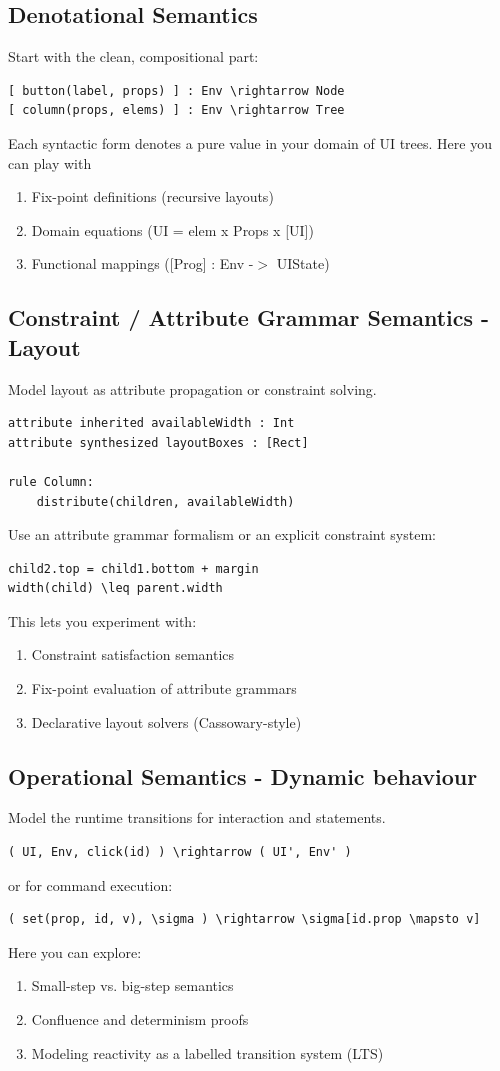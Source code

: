 \documentclass{article}
\begin{document}
\subsection{Denotational Semantics}
Start with the clean, compositional part:
\begin{verbatim}
[ button(label, props) ] : Env \rightarrow Node
[ column(props, elems) ] : Env \rightarrow Tree
\end{verbatim}
Each syntactic form denotes a pure value in your domain of UI trees. Here you can play with
\begin{enumerate}
\item Fix-point definitions (recursive layouts)
\item Domain equations (UI = elem x Props x [UI])
\item Functional mappings ([Prog] : Env -$>$ UIState)
\end{enumerate}

\subsection{Constraint / Attribute Grammar Semantics - Layout}
Model layout as attribute propagation or constraint solving.
\begin{verbatim}
attribute inherited availableWidth : Int
attribute synthesized layoutBoxes : [Rect]

rule Column:
	distribute(children, availableWidth)
\end{verbatim}
Use an attribute grammar formalism or an explicit constraint system:
\begin{verbatim}
child2.top = child1.bottom + margin
width(child) \leq parent.width
\end{verbatim}
This lets you experiment with:
\begin{enumerate}
\item Constraint satisfaction semantics
\item Fix-point evaluation of attribute grammars
\item Declarative layout solvers (Cassowary-style)
\end{enumerate}

\subsection{Operational Semantics - Dynamic behaviour}
Model the runtime transitions for interaction and statements.
\begin{verbatim}
( UI, Env, click(id) ) \rightarrow ( UI', Env' )
\end{verbatim}
or for command execution:
\begin{verbatim}
( set(prop, id, v), \sigma ) \rightarrow \sigma[id.prop \mapsto v]
\end{verbatim}
Here you can explore:
\begin{enumerate}
\item Small-step vs. big-step semantics
\item Confluence and determinism proofs
\item Modeling reactivity as a labelled transition system (LTS)
\end{enumerate}
\end{document}
